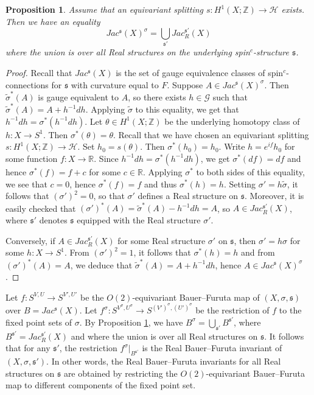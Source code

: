 \documentclass{amsart}
\newtheorem{proposition}[theorem]{Proposition}
\theoremstyle{definition}
\theoremstyle{remark}
\numberwithin{equation}{section}
\begin{document}
\begin{proposition}\label{prop:jacfix}
Assume that an equivariant splitting $s : H^1(X ; \mathbb{Z}) \to \mathcal{H}$ exists. Then we have an equality
\[
Jac^{\mathfrak{s}}(X)^{\sigma} = \bigcup_{\mathfrak{s}'} Jac^{\mathfrak{s}'}_R(X)
\]
where the union is over all Real structures on the underlying spin$^c$-structure $\mathfrak{s}$.
\end{proposition}
\begin{proof}
Recall that $Jac^{\mathfrak{s}}(X)$ is the set of gauge equivalence classes of spin$^c$-connections for $\mathfrak{s}$ with curvature equal to $F$. Suppose $A \in Jac^{\mathfrak{s}}(X)^{\sigma}$. Then $\widetilde{\sigma}^*(A)$ is gauge equivalent to $A$, so there exists $h \in \mathcal{G}$ such that $\widetilde{\sigma}^*(A) = A + h^{-1}dh$. Applying $\widetilde{\sigma}$ to this equality, we get that $h^{-1}dh = \sigma^*(h^{-1}dh)$. Let $\theta \in H^1(X ; \mathbb{Z})$ be the underlying homotopy class of $h : X \to S^1$. Then $\sigma^*(\theta) = \theta$. Recall that we have chosen an equivariant splitting $s : H^1(X ; \mathbb{Z}) \to \mathcal{H}$. Set $h_0 = s(\theta)$. Then $\sigma^*(h_0) = h_0$. Write $h = e^{if} h_0$ for some function $f : X \to \mathbb{R}$. Since $h^{-1}dh = \sigma^*(h^{-1}dh)$, we get $\sigma^*(df) = df$ and hence $\sigma^*(f) = f + c$ for some $c \in \mathbb{R}$. Applying $\sigma^*$ to both sides of this equality, we see that $c = 0$, hence $\sigma^*(f) = f$ and thus $\sigma^*(h) = h$. Setting $\sigma' = h \widetilde{\sigma}$, it follows that $(\sigma')^2 = 0$, so that $\sigma'$ defines a Real structure on $\mathfrak{s}$. Moreover, it is easily checked that $(\sigma')^*(A) = \widetilde{\sigma}^*(A) - h^{-1}dh = A$, so $A \in Jac_R^{\mathfrak{s}'}(X)$, where $\mathfrak{s}'$ denotes $\mathfrak{s}$ equipped with the Real structure $\sigma'$.

Conversely, if $A \in Jac_R^{\mathfrak{s}'}(X)$ for some Real structure $\sigma'$ on $\mathfrak{s}$, then $\sigma' = h \sigma$ for some $h : X \to S^1$. From $(\sigma')^2 = 1$, it follows that $\sigma^*(h) = h$ and from $(\sigma')^*(A) = A$, we deduce that $\widetilde{\sigma}^*(A) = A + h^{-1}dh$, hence $A \in Jac^{\mathfrak{s}}(X)^{\sigma}$.
\end{proof}

Let $f : S^{V,U} \to S^{V',U'}$ be the $O(2)$-equivariant Bauer--Furuta map of $(X , \sigma , \mathfrak{s})$ over $B = Jac^{\mathfrak{s}}(X)$. Let $f^{\sigma} : S^{V^\sigma,U^{\sigma}} \to S^{(V')^{\sigma}, (U')^{\sigma}}$ be the restriction of $f$ to the fixed point sets of $\sigma$. By Proposition \ref{prop:jacfix}, we have $B^\sigma = \bigcup_{\mathfrak{s}'} B^{\mathfrak{s}'}$, where $B^{\mathfrak{s}'} = Jac^{\mathfrak{s}'}_R(X)$ and where the union is over all Real structures on $\mathfrak{s}$. It follows that for any $\mathfrak{s}'$, the restriction $f^\sigma|_{B^{\mathfrak{s}'}}$ is the Real Bauer--Furuta invariant of $(X , \sigma , \mathfrak{s}')$. In other words, the Real Bauer--Furuta invariants for all Real structures on $\mathfrak{s}$ are obtained by restricting the $O(2)$-equivariant Bauer--Furuta map to different components of the fixed point set.
\end{document}
